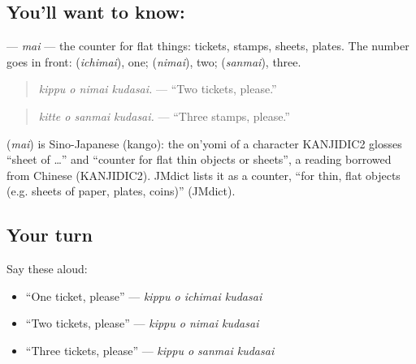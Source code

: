 \subsection*{You'll want to know: }
\textbf{} — \emph{mai} — the counter for flat things: tickets, stamps, sheets, plates. The number goes in front: \textbf{} (\emph{ichimai}), one; \textbf{} (\emph{nimai}), two; \textbf{} (\emph{sanmai}), three.

\begin{quote}
\textbf{  }
\end{quote}

\begin{quote}
\emph{kippu o nimai kudasai.} — \textquotedblleft{}Two tickets, please.\textquotedblright{}
\end{quote}

\begin{quote}
\textbf{  }
\end{quote}

\begin{quote}
\emph{kitte o sanmai kudasai.} — \textquotedblleft{}Three stamps, please.\textquotedblright{}
\end{quote}

\begin{cousinweb}
\textbf{} (\emph{mai}) is Sino-Japanese (kango): the on'yomi of a character KANJIDIC2 glosses \textquotedblleft{}sheet of …\textquotedblright{} and \textquotedblleft{}counter for flat thin objects or sheets\textquotedblright{}, a reading borrowed from Chinese (KANJIDIC2). JMdict lists it as a counter, \textquotedblleft{}for thin, flat objects (e.g. sheets of paper, plates, coins)\textquotedblright{} (JMdict).
\end{cousinweb}

\subsection*{Your turn}
Say these aloud:

\begin{itemize}
\raggedright
  \item \textquotedblleft{}One ticket, please\textquotedblright{} — \emph{kippu o ichimai kudasai}
  \item \textquotedblleft{}Two tickets, please\textquotedblright{} — \emph{kippu o nimai kudasai}
  \item \textquotedblleft{}Three tickets, please\textquotedblright{} — \emph{kippu o sanmai kudasai}
\end{itemize}

